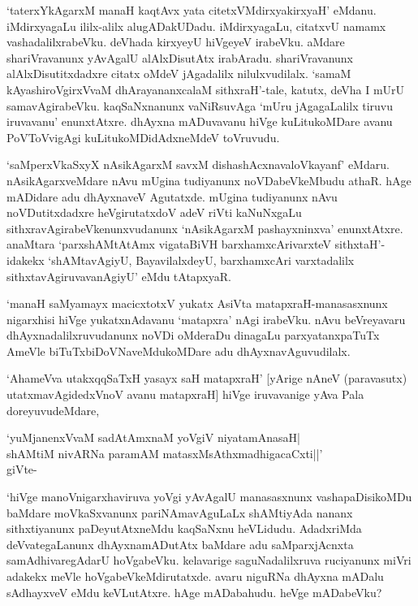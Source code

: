 `taterxYkAgarxM manaH kaqtAvx yata citetxVMdirxyakirxyaH' eMdanu. iMdirxyagaLu ililx-alilx alugADakUDadu. iMdirxyagaLu, citatxvU namamx vashadalilxrabeVku. deVhada kirxyeyU hiVgeyeV irabeVku. aMdare shariVravanunx yAvAgalU alAlxDisutAtx irabAradu. shariVravanunx alAlxDisutitxdadxre citatx oMdeV jAgadalilx nilulxvudilalx. `samaM kAyashiroVgirxVvaM dhArayananxcalaM sithxraH'-tale, katutx, deVha I mUrU samavAgirabeVku. kaqSaNxnanunx vaNiRsuvAga `mUru jAgagaLalilx tiruvu iruvavanu' enunxtAtxre. dhAyxna mADuvavanu hiVge kuLitukoMDare avanu PoVToVvigAgi kuLitukoMDidAdxneMdeV toVruvudu.

`saMperxVkaSxyX nAsikAgarxM savxM dishashAcxnavaloVkayanf' eMdaru. nAsikAgarxveMdare nAvu mUgina tudiyanunx noVDabeVkeMbudu athaR. hAge mADidare adu dhAyxnaveV Agutatxde. mUgina tudiyanunx nAvu noVDutitxdadxre heVgirutatxdoV adeV riVti kaNuNxgaLu sithxravAgirabeVkenunxvudanunx `nAsikAgarxM pashayxninxva' enunxtAtxre. anaMtara `parxshAMtAtAmx vigataBiVH barxhamxcArivarxteV sithxtaH'-idakekx `shAMtavAgiyU, BayavilalxdeyU, barxhamxcAri varxtadalilx sithxtavAgiruvavanAgiyU' eMdu tAtapxyaR.

`manaH saMyamayx macicxtotxV yukatx AsiVta matapxraH-manasasxnunx nigarxhisi hiVge yukatxnAdavanu `matapxra' nAgi irabeVku. nAvu beVreyavaru dhAyxnadalilxruvudanunx noVDi oMderaDu dinagaLu parxyatanxpaTuTx AmeVle biTuTxbiDoVNaveMdukoMDare adu dhAyxnavAguvudilalx.

`AhameVva utakxqqSaTxH yasayx saH matapxraH' [yArige nAneV (paravasutx) utatxmavAgidedxVnoV avanu matapxraH] hiVge iruvavanige yAva Pala doreyuvudeMdare,

\begin{shloka}
`yuMjanenxVvaM sadA\s \s tAmxnaM yoVgiV niyatamAnasaH|\\
shAMtiM nivARNa paramAM matasxMsAthxmadhigacaCxti||'\\
\hfill{giVte-}
\end{shloka}

`hiVge manoVnigarxhaviruva yoVgi yAvAgalU manasasxnunx vashapaDisikoMDu baMdare moVkaSxvanunx pariNAmavAguLaLx shAMtiyAda nananx sithxtiyanunx paDeyutAtxneMdu kaqSaNxnu heVLidudu. AdadxriMda deVvategaLanunx dhAyxnamADutAtx baMdare adu saMparxjAcnxta samAdhivaregAdarU hoVgabeVku. kelavarige saguNadalilxruva ruciyanunx miVri adakekx meVle hoVgabeVkeMdirutatxde. avaru niguRNa dhAyxna mADalu sAdhayxveV eMdu keVLutAtxre. hAge mADabahudu. heVge mADabeVku?

